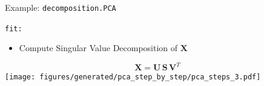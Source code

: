 \documentclass[presentation,mathserif,table]{beamer}
\newcommand{\X}{{\mathbold X}}
\newcommand{\bS}{{\mathbold S}}
\newcommand{\U}{{\mathbold U}}
\newcommand{\V}{{\mathbold V}}
\begin{document}
\begin{frame}[label={sec:orgc086682},fragile]{Example: \texttt{decomposition.PCA}}
 \begin{block}{\texttt{fit:}}
\begin{itemize}
\item Compute Singular Value Decomposition of \(\X\)
\end{itemize}
\begin{structureenv} %
\begin{equation}
\X = \U \, \bS \, \V^T
\end{equation}
\texttt{[image: figures/generated/pca\_step\_by\_step/pca\_steps\_3.pdf]}
\end{structureenv}
\end{block}
\end{frame}
\end{document}
